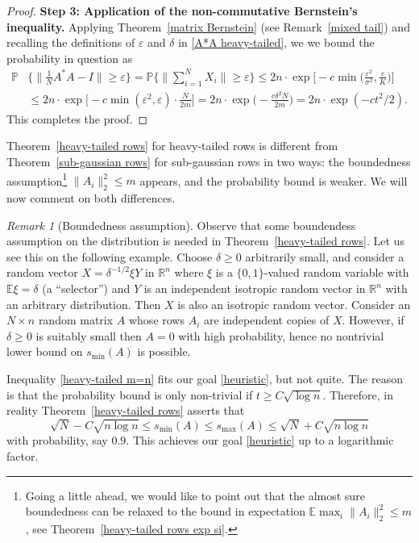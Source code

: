 \documentclass[10pt, openany]{book}
\theoremstyle{remark}
\newtheorem{remark}[theorem]{Remark}
\def \R {\mathbb{R}}
\def \E {\mathbb{E}}
\def \P {\mathbb{P}}
\def \e {\varepsilon}
\def \d {\delta}
\def \s {\sigma}
\def \smin {s_{\min}}
\def \smax {s_{\max}}
\begin{document}
\begin{proof}
{\bf Step 3: Application of the non-commutative Bernstein's inequality.}
Applying Theorem~\ref{matrix Bernstein} (see Remark~\ref{mixed tail})
and recalling the definitions of $\e$ and $\d$ in \eqref{A*A heavy-tailed}, we 
we bound the probability in question as 
\begin{align*}
\P &\Big\{ \Big\| \frac{1}{N} A^*A - I \Big\| \ge \e \Big\}
= \P \Big\{ \Big\| \sum_{i=1}^N X_i \Big\| \ge \e \Big\} 
\le 2n \cdot \exp \Big[ -c \min \Big( \frac{\e^2}{\s^2}, \frac{\e}{K} \Big) \Big] \\
&\le 2n \cdot \exp \Big[ -c \min(\e^2,\e) \cdot \frac{N}{2m} \Big] 
= 2n \cdot \exp \Big( - \frac{c \d^2 N}{2m} \Big)
= 2n \cdot \exp(-ct^2/2).
\end{align*}
This completes the proof. 
\end{proof}


Theorem~\ref{heavy-tailed rows} for heavy-tailed rows is different from 
Theorem~\ref{sub-gaussian rows} for sub-gaussian rows in two ways: 
the boundedness assumption\footnote{Going a little 
  ahead, we would like to point out that the almost sure boundedness can be relaxed to 
  the bound in expectation $\E \max_i \|A_i\|_2^2 \le m$,
  see Theorem~\ref{heavy-tailed rows exp si}.}  
$\|A_i\|_2^2 \le m$ appears, and the probability bound is weaker. 
We will now comment on both differences. 

\begin{remark}[Boundedness assumption]				\label{r: boundedness}
  Observe that some boundendess assumption on the distribution
  is needed in Theorem~\ref{heavy-tailed rows}.
  Let us see this on the following example. Choose $\d \ge 0$ arbitrarily small, and 
  consider a random vector $X = \d^{-1/2} \xi Y$ in $\R^n$
  where $\xi$ is a $\{0,1\}$-valued random variable with $\E \xi = \d$ (a ``selector'')
  and $Y$ is an independent isotropic random vector in $\R^n$ with an arbitrary distribution.
  Then $X$ is also an isotropic random vector. 
  Consider an $N \times n$ random matrix $A$ whose rows $A_i$ are independent copies of $X$.  
  However, if $\d \ge 0$ is suitably small then $A = 0$ with high probability,
  hence no nontrivial lower bound on $\smin(A)$ is possible. 
\end{remark}

Inequality \eqref{heavy-tailed m=n} fits our goal \eqref{heuristic}, but not quite. The reason is that the probability 
bound is only non-trivial if $t \ge C \sqrt{\log n}$. Therefore, in reality Theorem~\ref{heavy-tailed rows} 
asserts that 
\begin{equation}							\label{goal log}
\sqrt{N} - C\sqrt{n \log n} \le \smin(A) \le \smax(A) \le \sqrt{N} + C\sqrt{n \log n}
\end{equation}
with probability, say $0.9$. This achieves our goal \eqref{heuristic} up to a logarithmic factor. 
\end{document}
